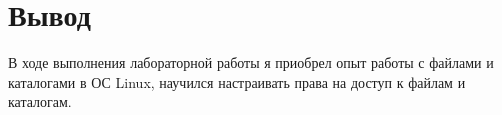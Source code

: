 \section*{Вывод}
В ходе выполнения лабораторной работы я приобрел опыт работы с файлами и каталогами в ОС Linux, научился настраивать права на доступ к файлам и каталогам.